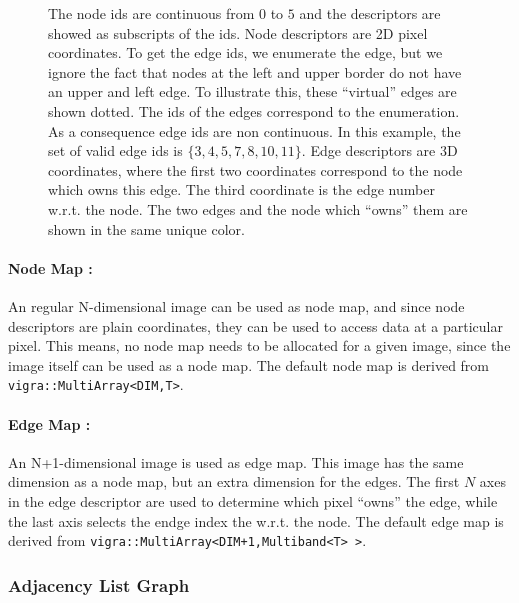 \begin{figure}[H]
{    The node ids are continuous from $0$ to $5$ and the descriptors
    are showed as subscripts of the ids.
    Node descriptors are 2D pixel coordinates.
    To get the edge ids, we enumerate the edge, but we ignore the fact that nodes at the
    left and upper border do
    not have an upper and left edge.
    To illustrate this, these ``virtual'' edges are shown dotted.
    The ids of the edges correspond to the enumeration.
    As a consequence edge ids are non continuous.    
    In this example, 
    the set of valid edge ids is $\{ 3,4,5,7,8,10,11 \}$.
    Edge descriptors are 3D coordinates, where the first two
    coordinates correspond to the node which owns this edge.
    The third coordinate is the edge number w.r.t. the node.
    The two edges and the node which ``owns'' them are
    shown in the same unique color.

}
\end{figure}

\paragraph{Node Map :} An regular N-dimensional image can
be used as node map, and since node descriptors are plain
coordinates, they can be used to access data at a
particular pixel.
This means, no node map needs to be allocated for a given
image, since the image itself can be used as a node map.
The default node map is derived from \lstinline{vigra::MultiArray<DIM,T>}.

\paragraph{Edge Map :} An N+1-dimensional image is
used as edge map.
This image has the same dimension as a node map, but an extra
dimension for the edges.
The first $N$ axes in the edge descriptor are 
used to determine which pixel ``owns'' the edge,
while the last axis selects the endge index the w.r.t. the node.
The default edge map is derived from \lstinline{vigra::MultiArray<DIM+1,Multiband<T> >}.



\subsubsection{Adjacency List Graph} \label{sec:graphs_adjacency_list_graph}

